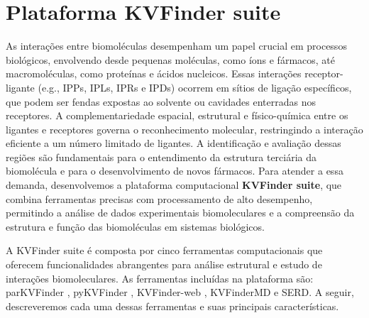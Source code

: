 \documentclass[Portugues]{phdquali}
\def\eg{e.g.\onedot}
\begin{document}

\chapter{Plataforma KVFinder suite \label{sec:kvfinder-suite}}



As interações entre biomoléculas desempenham um papel crucial em processos biológicos, envolvendo desde pequenas moléculas, como íons e fármacos, até macromoléculas, como proteínas e ácidos nucleicos. Essas interações receptor-ligante (\eg, IPPs, IPLs, IPRs e IPDs) ocorrem em sítios de ligação específicos, que podem ser fendas expostas ao solvente ou cavidades enterradas nos receptores. A complementariedade espacial, estrutural e físico-química entre os ligantes e receptores governa o reconhecimento molecular, restringindo a interação eficiente a um número limitado de ligantes. A identificação e avaliação dessas regiões são fundamentais para o entendimento da estrutura terciária da biomolécula e para o desenvolvimento de novos fármacos. Para atender a essa demanda, desenvolvemos a plataforma computacional \textbf{KVFinder suite}, que combina ferramentas precisas com processamento de alto desempenho, permitindo a análise de dados experimentais biomoleculares e a compreensão da estrutura e função das biomoléculas em sistemas biológicos.

A KVFinder suite é composta por cinco ferramentas computacionais que oferecem funcionalidades abrangentes para análise estrutural e estudo de interações biomoleculares. As ferramentas incluídas na plataforma são: parKVFinder \cite{guerra2020}, pyKVFinder \cite{guerra2021}, KVFinder-web \cite{guerra2023A}, KVFinderMD e SERD. A seguir, descreveremos cada uma dessas ferramentas e suas principais características.
\end{document}
